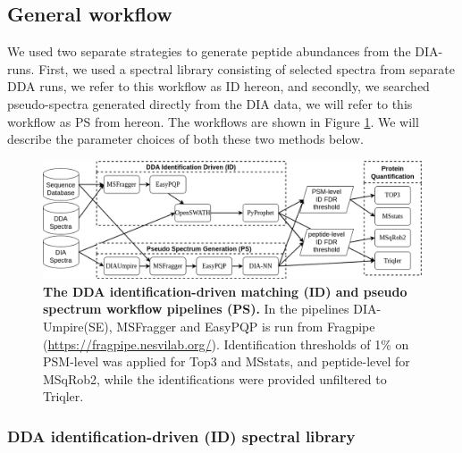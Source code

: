 \documentclass[10pt,letterpaper]{article}
\begin{document}
\subsection*{General workflow}

We used two separate strategies to generate peptide abundances from the DIA-runs. First, we used a spectral library consisting of selected spectra from separate DDA runs, we refer to this workflow as ID hereon, and secondly, we searched pseudo-spectra generated directly from the DIA data, we will refer to this workflow as PS from hereon. The workflows are shown in Figure \ref{fig:flowchart}. We will describe the parameter choices of both these two methods below.

\begin{figure}[htp]
    \centering
    \includegraphics[width=1.0\linewidth]{./img/methods.png} 
    \caption{{\bf The DDA identification-driven matching (ID) and pseudo spectrum workflow pipelines (PS).} In the pipelines DIA-Umpire(SE), MSFragger and EasyPQP is run from Fragpipe (\protect\url{https://fragpipe.nesvilab.org/}). Identification thresholds of 1\% on PSM-level was applied for Top3 and MSstats, and peptide-level for MSqRob2, while the identifications were provided unfiltered to Triqler. \label{fig:flowchart}}      
\end{figure}



\subsubsection*{DDA identification-driven (ID) spectral library}
\end{document}
